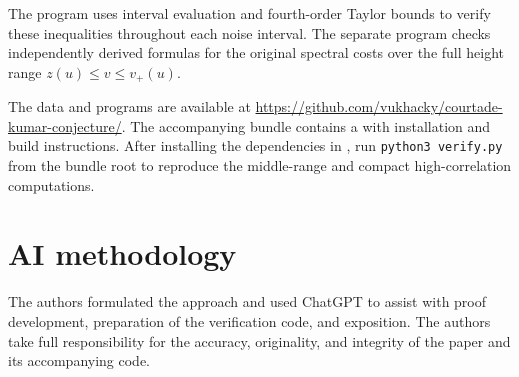 \documentclass[11pt,letterpaper]{amsart}
\newcommand{\1}{\mathbf 1}
\numberwithin{equation}{section}
\begin{document}
The program  uses interval
evaluation and fourth-order Taylor bounds to verify these
inequalities throughout each noise interval.
The separate program  checks
independently derived formulas for the original spectral costs
over the full height range $z(u)\le v\le v_+(u)$.

The data and programs are available at
\url{https://github.com/vukhacky/courtade-kumar-conjecture/}.
The accompanying bundle contains a  with
installation and build instructions.
After installing the dependencies in ,
run \texttt{python3 verify.py} from the bundle root to reproduce
the middle-range and compact high-correlation computations.

\section*{AI methodology}

The authors formulated the approach and used ChatGPT to assist
with proof development, preparation of the verification code,
and exposition. The authors take full responsibility for the
accuracy, originality, and integrity of the paper and its
accompanying code.
\end{document}
